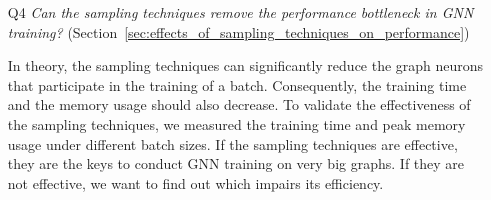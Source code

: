 \begin{itemize}
	\item[Q4] \emph{Can the sampling techniques remove the performance bottleneck in GNN training?} (Section~\ref{sec:effects_of_sampling_techniques_on_performance})
	
			In theory, the sampling techniques can significantly reduce the graph neurons that participate in the training of a batch.
			Consequently, the training time and the memory usage should also decrease.
			To validate the effectiveness of the sampling techniques, we measured the training time and peak memory usage under different batch sizes.
			If the sampling techniques are effective, they are the keys to conduct GNN training on very big graphs.
			If they are not effective, we want to find out which impairs its efficiency.
\end{itemize}
